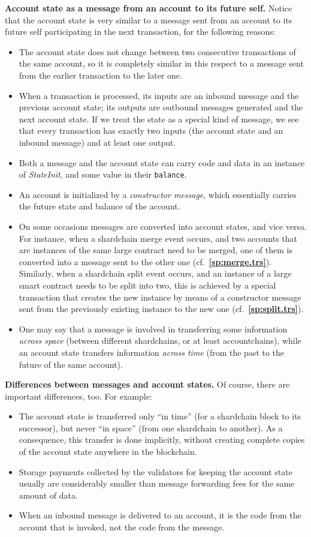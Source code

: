 \documentclass[12pt,oneside]{article}
\def\makepoint#1{\medbreak\noindent{\bf #1.\ }}
\def\nxsubpoint{\refstepcounter{subsubsection}%
  \smallbreak\makepoint{\thesubsubsection}}
\def\refpoint#1{{\rm\textbf{\ref{#1}}}}
\let\ptref=\refpoint
\def\emb#1{\textbf{#1.}}
\begin{document}
\nxsubpoint\label{sp:acc.as.msg}\emb{Account state as a message from an account to its future self}
Notice that the account state is very similar to a message sent from an account to its future self participating in the next transaction, for the following reasons:
\begin{itemize}
\item The account state does not change between two consecutive transactions of the same account, so it is completely similar in this respect to a message sent from the earlier transaction to the later one.
\item When a transaction is processed, its inputs are an inbound message and the previous account state; its outputs are outbound messages generated and the next account state. If we treat the state as a special kind of message, we see that every transaction has exactly two inputs (the account state and an inbound message) and at least one output.
\item Both a message and the account state can carry code and data in an instance of {\em StateInit}, and some value in their {\tt balance}.
\item An account is initialized by a {\em constructor message}, which essentially carries the future state and balance of the account.
\item On some occasions messages are converted into account states, and vice versa. For instance, when a shardchain merge event occurs, and two accounts that are instances of the same large contract need to be merged, one of them is converted into a message sent to the other one (cf.~\ptref{sp:merge.trs}). Similarly, when a shardchain split event occurs, and an instance of a large smart contract needs to be split into two, this is achieved by a special transaction that creates the new instance by means of a constructor message sent from the previously existing instance to the new one (cf.~\ptref{sp:split.trs}).
\item One may say that a message is involved in transferring some information {\em across space\/} (between different shardchains, or at least accountchains), while an account state transfers information {\em across time\/} (from the past to the future of the same account).
\end{itemize}

\nxsubpoint\emb{Differences between messages and account states}
Of course, there are important differences, too. For example:
\begin{itemize}
\item The account state is transferred only ``in time'' (for a shardchain block to its successor), but never ``in space'' (from one shardchain to another). As a consequence, this transfer is done implicitly, without creating complete copies of the account state anywhere in the blockchain.
\item Storage payments collected by the validators for keeping the account state usually are considerably smaller than message forwarding fees for the same amount of data.
\item When an inbound message is delivered to an account, it is the code from the account that is invoked, not the code from the message.
\end{itemize}
\end{document}
